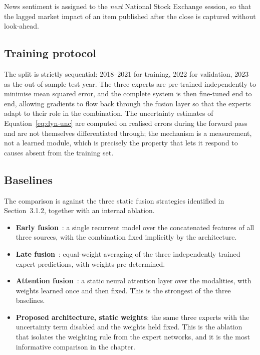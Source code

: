 News sentiment is assigned to the \emph{next} National Stock Exchange session, so that the lagged
market impact of an item published after the close is captured without look-ahead.

\subsection{Training protocol}

The split is strictly sequential: 2018--2021 for training, 2022 for validation, 2023 as the
out-of-sample test year. The three experts are pre-trained independently to minimise mean squared
error, and the complete system is then fine-tuned end to end, allowing gradients to flow back
through the fusion layer so that the experts adapt to their role in the combination. The
uncertainty estimates of Equation~\eqref{eq:dyn-unc} are computed on realised errors during the
forward pass and are not themselves differentiated through; the mechanism is a measurement, not a
learned module, which is precisely the property that lets it respond to causes absent from the
training set.

\subsection{Baselines}

The comparison is against the three static fusion strategies identified in Section~3.1.2,
together with an internal ablation.

\begin{itemize}
\item \textbf{Early fusion}~\cite{moodi2024}: a single recurrent model over the concatenated
features of all three sources, with the combination fixed implicitly by the architecture.
\item \textbf{Late fusion}~\cite{farimani2024}: equal-weight averaging of the three independently
trained expert predictions, with weights pre-determined.
\item \textbf{Attention fusion}~\cite{liu2019attention,haryono2023}: a static neural attention
layer over the modalities, with weights learned once and then fixed. This is the strongest of the
three baselines.
\item \textbf{Proposed architecture, static weights}: the same three experts with the uncertainty
term disabled and the weights held fixed. This is the ablation that isolates the weighting rule
from the expert networks, and it is the most informative comparison in the chapter.
\end{itemize}

